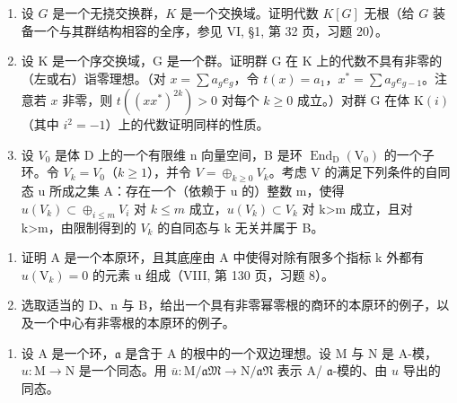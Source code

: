 \begin{enumerate}
\def\labelenumi{\arabic{enumi})}
\setcounter{enumi}{12}
\item
  设 \(G\) 是一个无挠交换群，\(K\) 是一个交换域。证明代数 \(K[G]\) 无根（给 \(G\) 装备一个与其群结构相容的全序，参见 VI, §1, 第 32 页，习题 20）。
\item
  设 \(\mathrm{K}\) 是一个序交换域，\(\mathrm{G}\) 是一个群。证明群 \(\mathrm{G}\) 在 \(\mathrm{K}\) 上的代数不具有非零的（左或右）诣零理想。（对 \(x = \sum a_{g}e_{g}\)，令 \(t(x) = a_{1}\)，\(x^{*} = \sum a_{g}e_{g - 1}\)。注意若 \(x\) 非零，则 \(t((xx^{*})^{2k}) > 0\) 对每个 \(k\geqslant 0\) 成立。）对群 \(\mathrm{G}\) 在体 \(\mathrm{K}(i)\)（其中 \(i^2 = -1\)）上的代数证明同样的性质。
\item
  设 \(V_{0}\) 是体 D 上的一个有限维 n 向量空间，B 是环 \(\operatorname{End}_{\mathrm{D}}(\mathrm{V}_{0})\) 的一个子环。令 \(V_{k}=V_{0}\)（\(k\geqslant1\)），并令 \(V=\oplus_{k\geqslant0}V_{k}\)。考虑 V 的满足下列条件的自同态 u 所成之集 A：存在一个（依赖于 u 的）整数 m，使得 \(u(V_{k})\subset\oplus_{i\leqslant m}V_{i}\) 对 \(k\leqslant m\) 成立，\(u(V_{k})\subset V_{k}\) 对 k\textgreater m 成立，且对 k\textgreater m，由限制得到的 \(V_{k}\) 的自同态与 k 无关并属于 B。
\end{enumerate}

\begin{enumerate}
\def\labelenumi{\alph{enumi})}
\tightlist
\item
  证明 A 是一个本原环，且其底座由 A 中使得对除有限多个指标 k 外都有 \(u(\mathrm{V}_{k}) = 0\) 的元素 u 组成（VIII, 第 130 页，习题 8）。
\item
  选取适当的 D、n 与 B，给出一个具有非零幂零根的商环的本原环的例子，以及一个中心有非零根的本原环的例子。
\end{enumerate}

\begin{enumerate}
\def\labelenumi{\arabic{enumi})}
\setcounter{enumi}{15}
\tightlist
\item
  设 A 是一个环，\(\mathfrak{a}\) 是含于 A 的根中的一个双边理想。设 M 与 N 是 A-模，\(u: \mathrm{M} \to \mathrm{N}\) 是一个同态。用 \(\overline{u}: \mathrm{M} / \mathfrak{aM} \to \mathrm{N} / \mathfrak{aN}\) 表示 A/ \(\mathfrak{a}\)-模的、由 \(u\) 导出的同态。
\end{enumerate}

